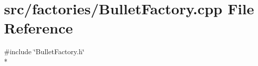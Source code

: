 \section{src/factories/\-Bullet\-Factory.cpp File Reference}
\label{_bullet_factory_8cpp}
{\ttfamily \#include \char`\"{}Bullet\-Factory.\-h\char`\"{}}\\*
